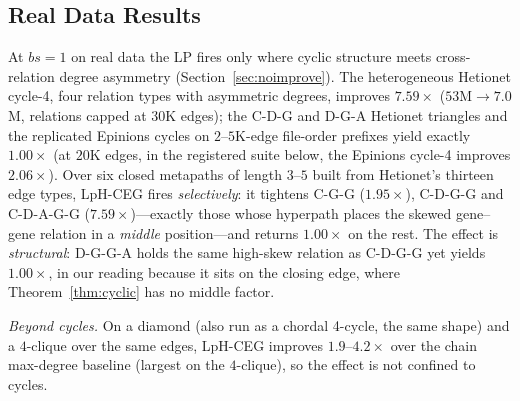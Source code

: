 \documentclass[conference]{IEEEtran}
\begin{document}
\subsection{Real Data Results}
\label{sec:realdata}

At $bs{=}1$ on real data the LP fires only where cyclic structure meets
cross-relation degree asymmetry (Section~\ref{sec:noimprove}). The
heterogeneous Hetionet cycle-4, four relation types with asymmetric
degrees, improves $7.59\times$ ($53$M${\to}7.0$M, relations capped at
$30$K edges); the C-D-G and D-G-A Hetionet triangles and the replicated Epinions
cycles on $2$--$5$K-edge file-order prefixes yield exactly $1.00\times$ (at $20$K
edges, in the registered suite below, the Epinions cycle-4 improves $2.06\times$).
Over six closed metapaths of length $3$--$5$
built from Hetionet's thirteen edge types, LpH-CEG fires
\emph{selectively}: it tightens C-G-G
($1.95\times$), C-D-G-G and C-D-A-G-G ($7.59\times$)---exactly those
whose hyperpath places the skewed gene--gene relation in a \emph{middle}
position---and returns $1.00\times$ on the rest. The effect is
\emph{structural}: D-G-G-A holds the same high-skew relation as C-D-G-G
yet yields $1.00\times$, in our reading because it sits on the closing edge, where Theorem~\ref{thm:cyclic} has no middle factor.

\emph{Beyond cycles.} On a diamond (also run as a chordal 4-cycle, the same shape) and a $4$-clique over the same edges, LpH-CEG improves $1.9$--$4.2\times$ over the chain max-degree baseline (largest on the $4$-clique), so the effect is not confined to cycles.
\end{document}
